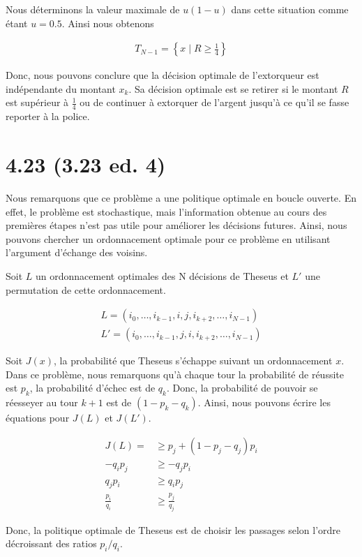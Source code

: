 \documentclass[oneside]{book}
\begin{document}
Nous déterminons la valeur maximale de $u(1-u)$ dans cette situation comme étant $u = 0.5$. Ainsi nous obtenons

\begin{align*}
  T_{N-1} = \left\{ x \mid R \geq \frac{1}{4} \right\}
\end{align*}

Donc, nous pouvons conclure que la décision optimale de l'extorqueur est indépendante du montant $x_k$. Sa décision optimale est se retirer si le montant $R$ est supérieur à $\frac{1}{4}$ ou de continuer à extorquer de l'argent jusqu'à ce qu'il se fasse reporter à la police. 

\section{4.23 (3.23 ed. 4)}
Nous remarquons que ce problème a une politique optimale en boucle ouverte. En effet, le problème est stochastique, mais l'information obtenue au cours des premières étapes n'est pas utile pour améliorer les décisions futures. Ainsi, nous pouvons chercher un ordonnacement optimale pour ce problème en utilisant l'argument d'échange des voisins.

Soit $L$ un ordonnacement optimales des N décisions de Theseus et $L'$ une permutation de cette ordonnacement.

\begin{gather*}
  L = (i_0,\ldots, i_{k-1},i,j,i_{k+2},\ldots, i_{N-1}) \\
  L' = (i_0,\ldots, i_{k-1},j,i,i_{k+2},\ldots, i_{N-1})
\end{gather*}

Soit $J(x)$, la probabilité que Theseus s'échappe suivant un ordonnacement $x$. Dans ce problème, nous remarquons qu'à chaque tour la probabilité de réussite est $p_k$, la probabilité d'échec est de $q_k$. Donc, la probabilité de pouvoir se réesseyer au tour $k+1$ est de $(1-p_k-q_k)$. Ainsi, nous pouvons écrire les équations pour $J(L)$ et $J(L')$.

\begin{align*}
  J(L) =&\geq p_j + (1-p_j-q_j)p_i \\
  -q_ip_j &\geq -q_jp_i \\
  q_jp_i &\geq q_ip_j \\
  \frac{p_i}{q_i} &\geq \frac{p_j}{q_j}
\end{align*}

Donc, la politique optimale de Theseus est de choisir les passages selon l'ordre décroissant des ratios $p_i/q_i$.
\end{document}
